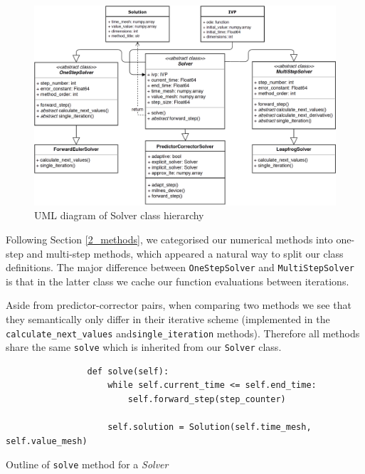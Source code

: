 \documentclass[12pt, twoside]{report}
\theoremstyle{plain}
\theoremstyle{definition}
\theoremstyle{definition}
\begin{document}
        \begin{figure}[H]
            \centering
                \includegraphics[width=0.9\columnwidth]{uml_diagram}
                \caption{UML diagram of Solver class hierarchy}
                \label{3_uml}
        \end{figure}

        Following Section \ref{2_methods}, we categorised our numerical
        methods into one-step and multi-step methods, which appeared a natural 
        way to split our class definitions. The major difference between
        \texttt{OneStepSolver} and 
        \texttt{MultiStepSolver} is that in the latter class we 
        cache our function evaluations between iterations. 

        Aside from predictor-corrector pairs, when comparing two methods we 
        see that they semantically only differ in their iterative scheme 
        (implemented in the \texttt{calculate_next_values} 
        and\linebreak \texttt{single_iteration} methods). 
        Therefore all methods share the same \texttt{solve} which 
        is inherited from our \texttt{Solver} class. 

        \begin{listing}[H]
            \begin{verbatim}
                def solve(self):
                    while self.current_time <= self.end_time:
                        self.forward_step(step_counter)

                    self.solution = Solution(self.time_mesh, self.value_mesh)
            \end{verbatim}
            \caption{
            Outline of \texttt{solve} method for a \textit{Solver}}
            \label{3_solve}
        \end{listing}
        
\end{document}
